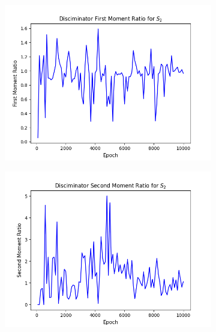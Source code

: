 \documentclass[11pt]{article} %
\begin{document}
\begin{figure}[H]
\begin{minipage}{\textwidth}
\end{minipage}
\begin{minipage}{\textwidth}
  \begin{subfigure}{.5\textwidth}
      \includegraphics[scale=0.5]{./images/moment_1_s2.png}
  \end{subfigure}
  \begin{subfigure}{.5\textwidth}
      \includegraphics[scale=0.5]{./images/moment_2_s2.png}
  \end{subfigure}
\end{minipage}
\begin{minipage}{\textwidth}
  \begin{subfigure}{.5\textwidth}

\end{subfigure}
\end{minipage}
\end{figure}
\end{document}
